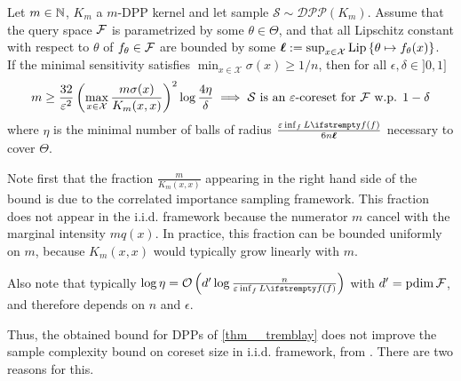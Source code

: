 \begin{tcolorbox}
	\begin{theorem}
		\label{thm__tremblay}
		Let $m \in \mathbb{N}$, $K_m$ a $m$-DPP kernel and let sample $\mathcal{S} \sim \mathcal{DPP}(K_m)$. Assume that the query space $\mathcal{F}$ is parametrized by some $\theta \in \Theta$, and that all Lipschitz constant with respect to $\theta$ of $f_\theta \in \mathcal{F}$ are bounded by some $\boldsymbol\ell := \sup_{x \in \mathcal{X}} \operatorname{Lip}\left\{\theta \mapsto f_\theta(x)\right\}$.\\

		If the minimal sensitivity satisfies $\min_{x\in \mathcal{X}}\sigma(x) \geq 1/n$, then for all $\epsilon, \delta \in ]0,1]$ 
		\begin{equation*}
            m \geq \frac{32}{\varepsilon^{2}}\left(\max_{x\in \mathcal{X}}\frac{m\sigma(x)}{K_m(x,x)}\right)^2 \log \frac{4\eta}{\delta}
			\implies 
			\text{$\mathcal{S}$ is an $\varepsilon$-coreset for $\mathcal{F}$ w.p. $1-\delta$}
		\end{equation*}
		where $\eta$ is the minimal number of balls of radius $\frac{\epsilon \inf_{f}\loss{f}}{6 n \lipschitz}$ necessary to cover $\Theta$.
	\end{theorem}
\end{tcolorbox}
Note first that the fraction $\frac{m}{K_m(x,x)}$ appearing in the right hand side of the bound is due to the correlated importance sampling framework. This fraction does not appear in the i.i.d. framework because the numerator $m$ cancel with the marginal intensity $mq(x)$. In practice, this fraction can be bounded uniformly on $m$, because $K_m(x,x)$ would typically grow linearly with $m$.

Also note that typically $\log \eta = \OO\left(\pdim \log \frac{n}{\epsilon \inf_{f}\loss{f}}\right)$ with ${d'} = \operatorname{pdim}\mathcal{F}$, and therefore depends on $n$ and $\epsilon$.


Thus, the obtained bound for DPPs of \cref{thm__tremblay} does not improve the sample complexity bound on coreset size in i.i.d. framework, from \cite{braverman2016coresetsota}. There are two reasons for this. 

